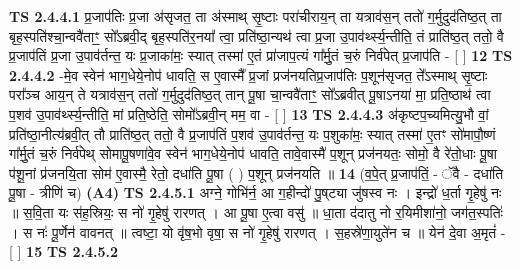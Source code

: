 \documentclass[17pt]{extarticle}
\begin{document}
                                        \textbf{ TS 2.4.4.1} \newline
                  प्र॒जाप॑तिः प्र॒जा अ॑सृजत॒ ता अ॑स्माथ् सृ॒ष्टाः परा॑चीराय॒न् ता यत्राव॑स॒न् ततो॑ ग॒र्मुदुद॑तिष्ठ॒त् ता बृह॒स्पति॑श्चा॒न्ववै॑ताꣳ॒॒ सो᳚ऽब्रवी॒द् बृह॒स्पति॑र॒नया᳚ त्वा॒ प्रति॑ष्ठा॒न्यथ॑ त्वा प्र॒जा उ॒पाव॑र्थ्स्य॒न्तीति॒ तं प्राति॑ष्ठ॒त् ततो॒ वै प्र॒जाप॑तिं प्र॒जा उ॒पाव॑र्तन्त॒ यः प्र॒जाका॑मः॒ स्यात् तस्मा॑ ए॒तं प्रा॑जाप॒त्यं गा᳚र्मु॒तं च॒रुं निर्व॑पेत् प्र॒जाप॑ति - [  ] \textbf{  12} \newline
                  \newline
                                \textbf{ TS 2.4.4.2} \newline
                  -मे॒व स्वेन॑ भाग॒धेये॒नोप॑ धावति॒ स ए॒वास्मै᳚ प्र॒जां प्रज॑नयतिप्र॒जाप॑तिः प॒शून॑सृजत॒ ते᳚ऽस्माथ् सृ॒ष्टाः परा᳚ञ्च आय॒न् ते यत्राव॑स॒न् ततो॑ ग॒र्मुदुद॑तिष्ठ॒त् तान् पू॒षा चा॒न्ववै॑ताꣳ॒॒ सो᳚ऽब्रवीत् पू॒षाऽनया॑ मा॒ प्रति॒ष्ठाथ॑ त्वा प॒शव॑ उ॒पाव॑र्थ्स्य॒न्तीति॒ मां प्रति॒ष्ठेति॒ सोमो᳚ऽब्रवी॒न् मम॒ वा - [  ] \textbf{  13} \newline
                  \newline
                                \textbf{ TS 2.4.4.3} \newline
                  अ॑कृष्टप॒च्यमित्यु॒भौ वां॒ प्रति॑ष्ठा॒नीत्य॑ब्रवी॒त् तौ प्राति॑ष्ठ॒त् ततो॒ वै प्र॒जाप॑तिं प॒शव॑ उ॒पाव॑र्तन्त॒ यः प॒शुका॑मः॒ स्यात् तस्मा॑ ए॒तꣳ सो॑मापौ॒ष्णं गा᳚र्मु॒तं च॒रुं निर्व॑पेथ् सोमापू॒षणा॑वे॒व स्वेन॑ भाग॒धेये॒नोप॑ धावति॒ तावे॒वास्मै॑ प॒शून् प्रज॑नयतः॒ सोमो॒ वै रे॑तो॒धाः पू॒षा प॑शू॒नां प्र॑जनयि॒ता सोम॑ ए॒वास्मै॒ रेतो॒ दधा॑ति पू॒षा ( ) प॒शून् प्रज॑नयति ॥ \textbf{  14} \newline
                  \newline
                      (व॒पे॒त् प्र॒जाप॑तिं॒ - ॅवै - दधा॑ति पू॒षा - त्रीणि॑ च)  \textbf{(A4)} \newline \newline
                                        \textbf{ TS 2.4.5.1} \newline
                  अग्ने॒ गोभि॑र्न॒ आ ग॒हीन्दो॑ पु॒ष्‌ट्या जु॑षस्व नः । इन्द्रो॑ ध॒र्ता गृ॒हेषु॑ नः ॥ स॒वि॒ता यः स॑ह॒स्रियः॒ स नो॑ गृ॒हेषु॑ रारणत् । आ पू॒षा ए॒त्वा वसु॑ ॥ धा॒ता द॑दातु नो र॒यिमीशा॑नो॒ जग॑त॒स्पतिः॑ । स नः॑ पू॒र्णेन॑ वावनत् ॥ त्वष्टा॒ यो वृ॑ष॒भो वृषा॒ स नो॑ गृ॒हेषु॑ रारणत् । स॒हस्रे॑णा॒युते॑न च ॥ येन॑ दे॒वा अ॒मृतं॑ - [  ] \textbf{  15} \newline
                  \newline
                                \textbf{ TS 2.4.5.2} \newline
\end{document}
